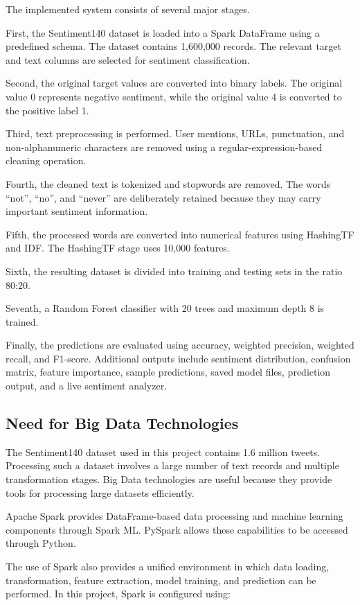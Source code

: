 \documentclass[12pt,a4paper]{article}
\begin{document}
The implemented system consists of several major stages.

First, the Sentiment140 dataset is loaded into a Spark DataFrame using a predefined schema. The dataset contains 1,600,000 records. The relevant target and text columns are selected for sentiment classification.

Second, the original target values are converted into binary labels. The original value 0 represents negative sentiment, while the original value 4 is converted to the positive label 1.

Third, text preprocessing is performed. User mentions, URLs, punctuation, and non-alphanumeric characters are removed using a regular-expression-based cleaning operation.

Fourth, the cleaned text is tokenized and stopwords are removed. The words ``not'', ``no'', and ``never'' are deliberately retained because they may carry important sentiment information.

Fifth, the processed words are converted into numerical features using HashingTF and IDF. The HashingTF stage uses 10,000 features.

Sixth, the resulting dataset is divided into training and testing sets in the ratio 80:20.

Seventh, a Random Forest classifier with 20 trees and maximum depth 8 is trained.

Finally, the predictions are evaluated using accuracy, weighted precision, weighted recall, and F1-score. Additional outputs include sentiment distribution, confusion matrix, feature importance, sample predictions, saved model files, prediction output, and a live sentiment analyzer.

\subsection{Need for Big Data Technologies}

The Sentiment140 dataset used in this project contains 1.6 million tweets. Processing such a dataset involves a large number of text records and multiple transformation stages. Big Data technologies are useful because they provide tools for processing large datasets efficiently.

Apache Spark provides DataFrame-based data processing and machine learning components through Spark ML. PySpark allows these capabilities to be accessed through Python.

The use of Spark also provides a unified environment in which data loading, transformation, feature extraction, model training, and prediction can be performed. In this project, Spark is configured using:
\end{document}
